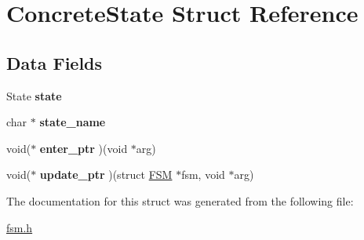 \hypertarget{structConcreteState}{}\section{Concrete\+State Struct Reference}
\label{structConcreteState}
\subsection*{Data Fields}
\begin{DoxyCompactItemize}
\item 
\mbox{\label{structConcreteState_a5de94c9966ffc8c81cb7a488c9e0a5a7}} 
State {\bfseries state}
\item 
\mbox{\label{structConcreteState_afff321e10193d86052f43642e382f862}} 
char $\ast$ {\bfseries state\+\_\+name}
\item 
\mbox{\label{structConcreteState_a1c9b6626bd14ea7b69d43157f890f496}} 
void($\ast$ {\bfseries enter\+\_\+ptr} )(void $\ast$arg)
\item 
\mbox{\label{structConcreteState_a1a0e28d085667b496f1d16bfbae6231a}} 
void($\ast$ {\bfseries update\+\_\+ptr} )(struct \hyperlink{structFSM}{F\+SM} $\ast$fsm, void $\ast$arg)
\end{DoxyCompactItemize}


The documentation for this struct was generated from the following file\+:\begin{DoxyCompactItemize}
\item 
\hyperlink{fsm_8h}{fsm.\+h}\end{DoxyCompactItemize}
